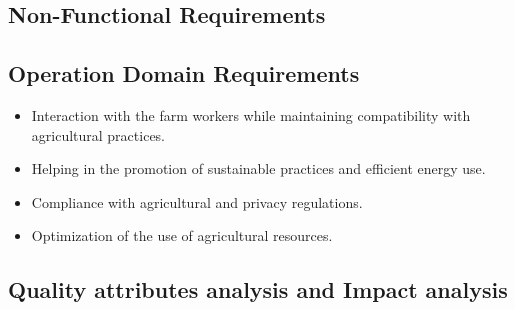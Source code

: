 \subsection{Non-Functional Requirements}

\subsection{Operation Domain Requirements}

\begin{itemize}
    \item Interaction with the farm workers while maintaining compatibility with agricultural practices.
    \item Helping in the promotion of sustainable practices and efficient energy use.
    \item Compliance with agricultural and privacy regulations.
    \item Optimization of the use of agricultural resources.
\end{itemize}

\clearpage
\subsection{Quality attributes analysis and Impact analysis}

